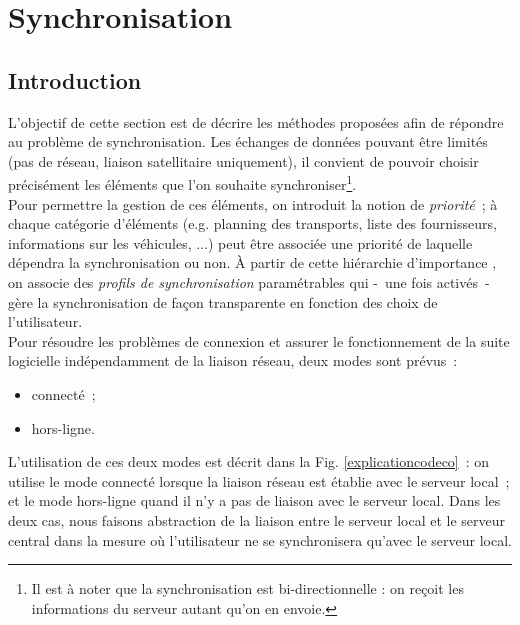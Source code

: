\section{Synchronisation}\label{SynchronisationTechnique}

% 

\subsection{Introduction}
L'objectif de cette section est de décrire les méthodes proposées afin de répondre au problème de synchronisation.
Les échanges de données pouvant être limités (pas de réseau, liaison satellitaire uniquement), il convient de pouvoir choisir précisément les éléments que l'on souhaite synchroniser\footnote{Il est à noter que la synchronisation est bi-directionnelle : on reçoit les informations du serveur autant qu'on en envoie.}.
\\
Pour permettre la gestion de ces éléments, on introduit la notion de \emph{priorité}~; à chaque catégorie d'éléments (e.g. planning des transports, liste des fournisseurs, informations sur les véhicules, ...) peut être associée une priorité de laquelle dépendra la synchronisation ou non.
À partir de cette \og hiérarchie d'importance \fg{}, on associe des \emph{profils de synchronisation} paramétrables qui -~une fois activés~- gère la synchronisation de façon transparente en fonction des choix de l'utilisateur.
\\
Pour résoudre les problèmes de connexion et assurer le fonctionnement de la suite logicielle indépendamment de la liaison réseau, deux modes sont prévus~:
\begin{itemize}
    \item connecté~;
    \item hors-ligne.
\end{itemize}
L'utilisation de ces deux modes est décrit dans la Fig. \ref{explicationcodeco}~: on utilise le mode connecté lorsque la liaison réseau est établie avec le serveur local~; et le mode hors-ligne quand il n'y a pas de liaison avec le serveur local.
Dans les deux cas, nous faisons abstraction de la liaison entre le serveur local et le serveur central dans la mesure où l'utilisateur ne se synchronisera qu'avec le serveur local.
